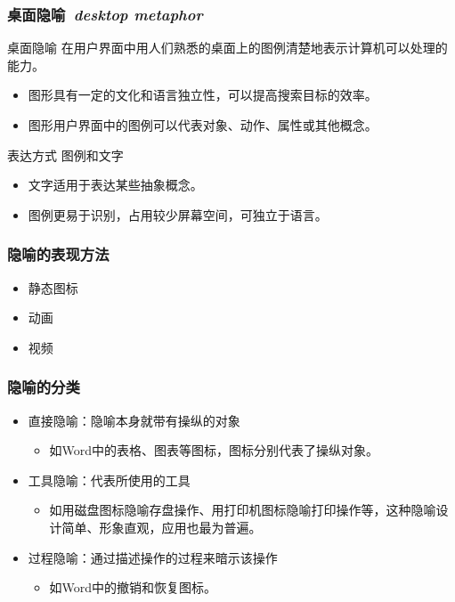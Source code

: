 \documentclass{beamer}
\begin{document}
\begin{frame}
	\frametitle{桌面隐喻~\textit{desktop metaphor}}
	\beamertemplatetransparentcovereddynamicmedium
	\begin{beamerboxesrounded}[shadow=true]{桌面隐喻}
		在用户界面中用人们熟悉的桌面上的图例清楚地表示计算机可以处理的能力。
		\begin{itemize}
			\item 图形具有一定的文化和语言独立性，可以提高搜索目标的效率。
			\item 图形用户界面中的图例可以代表对象、动作、属性或其他概念。
		\end{itemize}
	\end{beamerboxesrounded}
	\pause
	\begin{beamerboxesrounded}[shadow=true]{表达方式}
		图例和文字
		\begin{itemize}
			\item 文字适用于表达某些抽象概念。
			\item 图例更易于识别，占用较少屏幕空间，可独立于语言。
		\end{itemize}
	\end{beamerboxesrounded}
\end{frame}

\begin{frame}
	\frametitle{隐喻的表现方法}
	\begin{itemize}
		\item 静态图标
		\item 动画
		\item 视频
	\end{itemize}
\end{frame}

\begin{frame}
	\frametitle{隐喻的分类}
	\begin{itemize}
		\item 直接隐喻：隐喻本身就带有操纵的对象
		\begin{itemize}
			\item 如Word中的表格、图表等图标，图标分别代表了操纵对象。
		\end{itemize}
		\item 工具隐喻：代表所使用的工具
		\begin{itemize}
			\item 如用磁盘图标隐喻存盘操作、用打印机图标隐喻打印操作等，这种隐喻设计简单、形象直观，应用也最为普遍。
		\end{itemize}
		\item 过程隐喻：通过描述操作的过程来暗示该操作
		\begin{itemize}
			\item 如Word中的撤销和恢复图标。
		\end{itemize}
	\end{itemize}
\end{frame}
\end{document}
